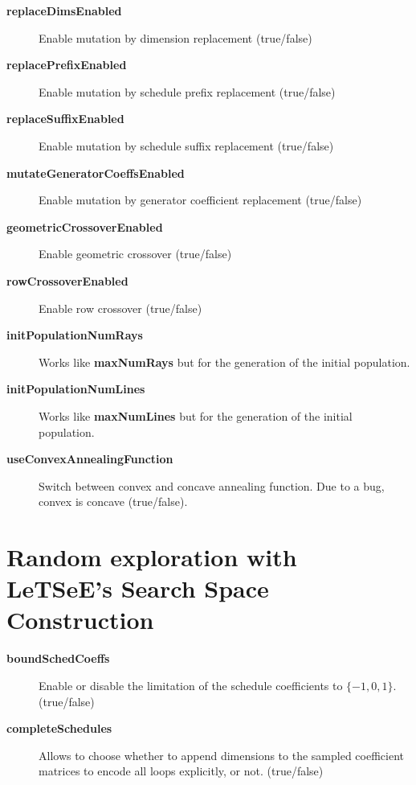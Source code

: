 \documentclass{article}
\begin{document}
\begin{description}
      \item[\textbf{replaceDimsEnabled}] Enable mutation by dimension replacement (true/false)
      \item[\textbf{replacePrefixEnabled}] Enable mutation by schedule prefix replacement (true/false)
      \item[\textbf{replaceSuffixEnabled}] Enable mutation by schedule suffix replacement (true/false)
      \item[\textbf{mutateGeneratorCoeffsEnabled}] Enable mutation by generator coefficient replacement (true/false)
      \item[\textbf{geometricCrossoverEnabled}] Enable geometric crossover (true/false)
      \item[\textbf{rowCrossoverEnabled}] Enable row crossover (true/false)
      \item[\textbf{initPopulationNumRays}] Works like \textbf{maxNumRays} but for the generation of the initial population.
      \item[\textbf{initPopulationNumLines}] Works like \textbf{maxNumLines} but for the generation of the initial population.
      \item[\textbf{useConvexAnnealingFunction}] Switch between convex and concave annealing function. Due to a bug, convex is concave (true/false).
    \end{description}

    \section{Random exploration with LeTSeE's Search Space Construction}
    \begin{description}
      \item[\textbf{boundSchedCoeffs}] Enable or disable the limitation of the
      schedule coefficients to $\lbrace -1, 0, 1 \rbrace$. (true/false)
      \item[\textbf{completeSchedules}] Allows to choose whether to append
      dimensions to the sampled coefficient matrices to encode all loops
      explicitly, or not. (true/false)
    \end{description}
\end{document}
